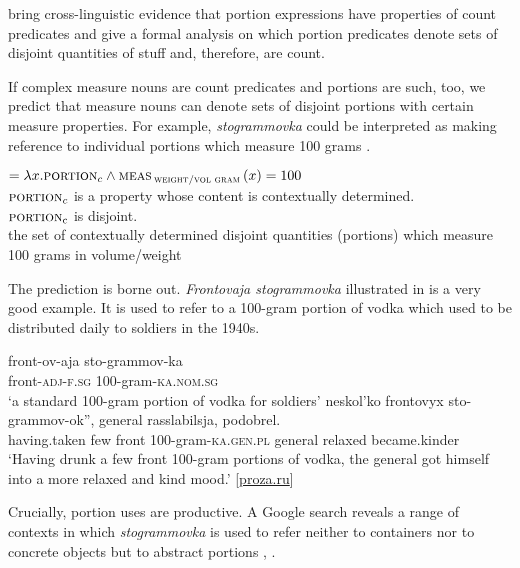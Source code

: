 \documentclass[output=paper,
colorlinks,
citecolor=brown,
newtxmath
]{langscibook}
\begin{document}
\noindent \citet{Khrizman.etal2015} bring cross-linguistic evidence that portion expressions have properties of count predicates and give a formal analysis on which portion predicates denote sets of disjoint quantities of stuff and, therefore, are count.

If complex measure nouns are count predicates and portions are such, too, we predict that measure nouns can denote sets of disjoint portions with certain measure properties. For example, \textit{stogrammovka} could be interpreted as making reference to individual portions which measure 100 grams .

\ea\label{ex:37}  $= \lambda x.\textsc{portion}_{c} \wedge \textsc{meas}\,_{\textsc{weight/vol gram}}\,(x) = 100$\\
\hspace{.9em} {\small $\textsc{portion}_{c}$ is a property whose content is contextually determined.\\
\hspace{1em} $\textsc{portion}\textsubscript{c}$ is disjoint.\\
the set of contextually determined disjoint quantities (portions) which measure 100 grams in volume/weight}
\z

\noindent The prediction is borne out. \textit{Frontovaja stogrammovka} illustrated in  is a very good example. It is used to refer to a 100-gram portion of vodka which used to be distributed daily to soldiers in the 1940s.

\ea\label{ex:38}
    \ea \gll front-ov-aja sto-grammov-ka\\
    front-\textsc{adj-f.sg} 100-gram-\textsc{ka.nom.sg}\\
    \glt `a standard 100-gram portion of vodka for soldiers'
    \ex {} neskol'ko  frontovyx sto-grammov-ok'', general rasslabilsja, podobrel.\\
    having.taken few {} front 100-gram-\textsc{ka.gen.pl} general relaxed became.kinder\\
    \glt `Having drunk a few front 100-gram portions of vodka, the general got himself into a more relaxed and kind mood.' \hfill [\href{https://www.proza.ru/2012/07/06/1250}{proza.ru}]
\z\z

\noindent Crucially, portion uses are productive. A Google search reveals a range of contexts in which \textit{stogrammovka} is used to refer neither to containers nor to concrete objects but to abstract portions , .
\end{document}
